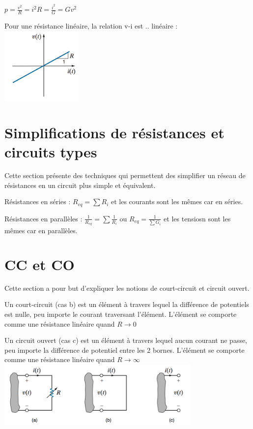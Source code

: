 \documentclass[11pt]{report}
\begin{document}
\begin{framed}
   $p = \frac{v^2}{R} = i^2R = \frac{i^2}{G} = Gv^2$ \newline

   Pour une résistance linéaire, la relation v-i est .. linéaire : \newline
  \includegraphics[width=4cm]{4.png}

\end{framed}

\section{Simplifications de résistances et circuits types}
Cette section présente des techniques qui permettent des simplifier un réseau de résistances en un circuit plus simple et équivalent.
\begin{framed}
   Résistances en séries : ${ R }_{ eq }=\sum { { R }_{ i } }$ et les courants sont les mêmes car en séries.\newline

   Résistances en parallèles : $\frac { 1 }{ { R }_{ eq } } =\sum { \frac { 1 }{ { R }_{ i } }  } $ ou ${ R }_{ eq }=\frac { 1 }{ \sum { { G }_{ i } }  } $ et les tensiosn sont les mêmes car en parallèles.\newline

\end{framed}

\section{CC et CO}
Cette section a pour but d'expliquer les notions de court-circuit et circuit ouvert.
\begin{framed}
   Un court-circuit (cas b) est un élément à travers lequel la différence de potentiels est nulle, peu importe le courant traversant l'élément. L'élément se comporte comme une résistance linéaire quand $R\rightarrow 0 $\newline

   Un circuit ouvert (cas c) est un élément à travers lequel aucun courant ne passe, peu importe la différence de potentiel entre les 2 bornes. L'élément se comporte comme une résistance linéaire quand $R\rightarrow \infty $\newline
      \includegraphics[width=10cm]{5.png}

\end{framed}
\end{document}
